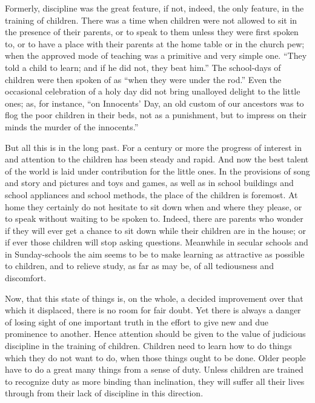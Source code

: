 \documentclass[
]{book}
\begin{document}
Formerly, discipline was the great feature, if not, indeed, the only feature, in the training of children. There was a time when children were not allowed to sit in the presence of their parents, or to speak to them unless they were first spoken to, or to have a place with their parents at the home table or in the church pew; when the approved mode of teaching was a primitive and very simple one. ``They told a child to learn; and if he did not, they beat him.'' The school-days of children were then spoken of as ``when they were under the rod.'' Even the occasional celebration of a holy day did not bring unalloyed delight to the little ones; as, for instance, ``on Innocents' Day, an old custom of our ancestors was to flog the poor children in their beds, not as a punishment, but to impress on their minds the murder of the innocents.''

But all this is in the long past. For a century or more the progress of interest in and attention to the children has been steady and rapid. And now the best talent of the world is laid under contribution for the little ones. In the provisions of song and story and pictures and toys and games, as well as in school buildings and school appliances and school methods, the place of the children is foremost. At home they certainly do not hesitate to sit down when and where they please, or to speak without waiting to be spoken to. Indeed, there are parents who wonder if they will ever get a chance to sit down while their children are in the house; or if ever those children will stop asking questions. Meanwhile in secular schools and in Sunday-schools the aim seems to be to make learning as attractive as possible to children, and to relieve study, as far as may be, of all tediousness and discomfort.

Now, that this state of things is, on the whole, a decided improvement over that which it displaced, there is no room for fair doubt. Yet there is always a danger of losing sight of one important truth in the effort to give new and due prominence to another. Hence attention should be given to the value of judicious discipline in the training of children. Children need to learn how to do things which they do not want to do, when those things ought to be done. Older people have to do a great many things from a sense of duty. Unless children are trained to recognize duty as more binding than inclination, they will suffer all their lives through from their lack of discipline in this direction.
\end{document}
